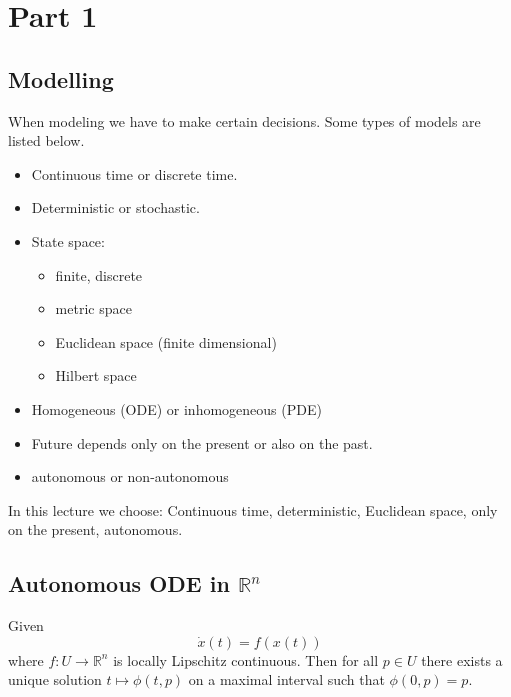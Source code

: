 \documentclass{article}
\newcommand*{\R}{\mathbb{R}}
\begin{document}
\section{Part 1}

\subsection{Modelling}

When modeling we have to make certain decisions. Some types of models are listed below.

\begin{itemize}
    \item Continuous time or discrete time.

    \item Deterministic or stochastic.

    \item State space:
    \begin{itemize}
        \item finite, discrete

        \item metric space

        \item Euclidean space (finite dimensional)

        \item Hilbert space
    \end{itemize}

    \item Homogeneous (ODE) or inhomogeneous (PDE)

    \item Future depends only on the present or also on the past.

    \item autonomous or non-autonomous
\end{itemize}

In this lecture we choose: Continuous time, deterministic, Euclidean space, only on the present, autonomous.
\newline
\newline
\subsection{Autonomous ODE in $\R^n$}
\begin{thm}
    Given
    $$\dot x(t) = f(x(t))$$
    where $f:U \to \R^n$ is locally Lipschitz continuous. Then for all $p \in U$ there exists a unique  solution $t\mapsto \phi(t,p)$ on a maximal interval such that $\phi(0,p) = p$.
\end{thm}
\end{document}
